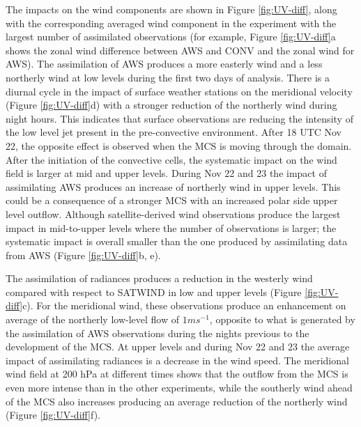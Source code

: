 \documentclass[final,5p,times,twocolumn,authoryear]{elsarticle} %
\begin{document}
The impacts on the wind components are shown in Figure \ref{fig:UV-diff}, along with the corresponding averaged wind component in the experiment with the largest number of assimilated observations (for example, Figure \ref{fig:UV-diff}a shows the zonal wind difference between AWS and CONV and the zonal wind for AWS). The assimilation of AWS produces a more easterly wind and a less northerly wind at low levels during the first two days of analysis. There is a diurnal cycle in the impact of surface weather stations on the meridional velocity (Figure \ref{fig:UV-diff}d) with a stronger reduction of the northerly wind during night hours. This indicates that surface observations are reducing the intensity of the low level jet present in the pre-convective environment. After 18 UTC Nov 22, the opposite effect is observed when the MCS is moving through the domain. After the initiation of the convective cells, the systematic impact on the wind field is larger at mid and upper levels. During Nov 22 and 23 the impact of assimilating AWS produces an increase of northerly wind in upper levels. This could be a consequence of a stronger MCS with an increased polar side upper level outflow. Although satellite-derived wind observations produce the largest impact in mid-to-upper levels where the number of observations is larger; the systematic impact is overall smaller than the one produced by assimilating data from AWS (Figure \ref{fig:UV-diff}b, e).

The assimilation of radiances produces a reduction in the westerly wind compared with respect to SATWIND in low and upper levels (Figure \ref{fig:UV-diff}c). For the meridional wind, these observations produce an enhancement on average of the northerly low-level flow of \(1 ms^{-1}\), opposite to what is generated by the assimilation of AWS observations during the nights previous to the development of the MCS. At upper levels and during Nov 22 and 23 the average impact of assimilating radiances is a decrease in the wind speed. The meridional wind field at 200 hPa at different times shows that the outflow from the MCS is even more intense than in the other experiments, while the southerly wind ahead of the MCS also increases producing an average reduction of the northerly wind (Figure \ref{fig:UV-diff}f).
\end{document}
